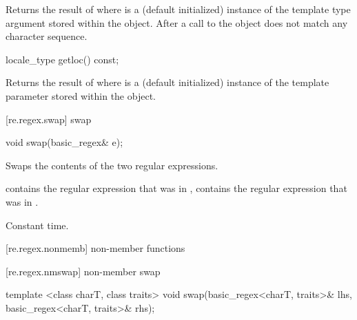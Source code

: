 \begin{itemdescr}
\pnum\effects  Returns the result of  where
 is a (default initialized) instance of the template
type argument  stored within the object.  After a call
to  the  object does not match any
character sequence.
\end{itemdescr}

%
%
\begin{itemdecl}
locale_type getloc() const; 
\end{itemdecl}

\begin{itemdescr}
\pnum\effects  Returns the result of  where
 is a (default initialized) instance of the template
parameter  stored within the object.
\end{itemdescr}

[re.regex.swap]{ swap}
%
%

%
%
\begin{itemdecl}
void swap(basic_regex& e); 
\end{itemdecl}

\begin{itemdescr}
\pnum\effects  Swaps the contents of the two regular expressions. 

\pnum\postcondition  {} contains the regular expression
that was in ,  contains the regular expression that
was in . 

\pnum\complexity Constant time. 
\end{itemdescr}

[re.regex.nonmemb]{ non-member functions}

[re.regex.nmswap]{ non-member swap}
%
%
\begin{itemdecl}
template <class charT, class traits>
  void swap(basic_regex<charT, traits>& lhs, basic_regex<charT, traits>& rhs); 
\end{itemdecl}

